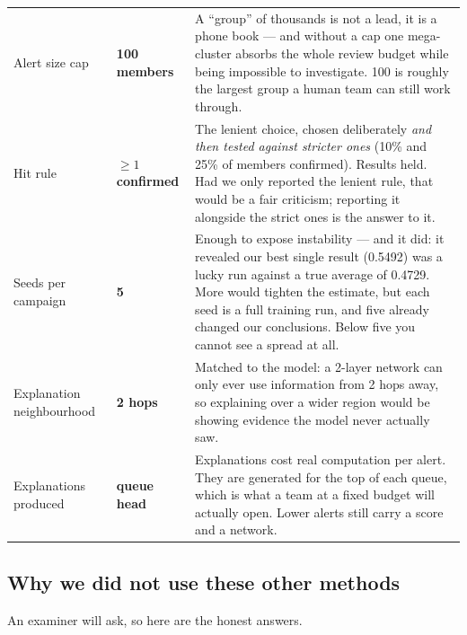 \documentclass[11pt,a4paper]{article}
\begin{document}
\begin{longtable}{@{}p{3.5cm}p{1.6cm}p{9.9cm}@{}}
\addlinespace
Alert size cap & \textbf{100 members} &
A ``group'' of thousands is not a lead, it is a phone book --- and without a cap
one mega-cluster absorbs the whole review budget while being impossible to
investigate. 100 is roughly the largest group a human team can still work
through. \\
\addlinespace
Hit rule & \textbf{$\geq 1$ confirmed} &
The lenient choice, chosen deliberately \emph{and then tested against stricter
ones} (10\% and 25\% of members confirmed). Results held. Had we only reported
the lenient rule, that would be a fair criticism; reporting it alongside the
strict ones is the answer to it. \\
\addlinespace
Seeds per campaign & \textbf{5} &
Enough to expose instability --- and it did: it revealed our best single result
(0.5492) was a lucky run against a true average of 0.4729. More would tighten
the estimate, but each seed is a full training run, and five already changed
our conclusions. Below five you cannot see a spread at all. \\
\addlinespace
Explanation neighbourhood & \textbf{2 hops} &
Matched to the model: a 2-layer network can only ever use information from 2
hops away, so explaining over a wider region would be showing evidence the model
never actually saw. \\
\addlinespace
Explanations produced & \textbf{queue head} &
Explanations cost real computation per alert. They are generated for the top of
each queue, which is what a team at a fixed budget will actually open. Lower
alerts still carry a score and a network. \\
\bottomrule
\end{longtable}

\subsection{Why we did not use these other methods}

An examiner will ask, so here are the honest answers.
\end{document}
